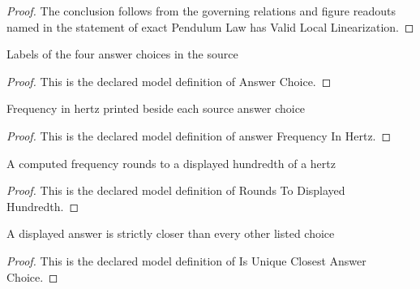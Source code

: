 \begin{proof}
  The conclusion follows from the governing relations and figure readouts named in the statement of exact Pendulum Law has Valid Local Linearization.
\end{proof}
\begin{definition}
  \label{def:physics:phyx-mini-0719:phyxminiproblems-problemphyxmini0719-answerchoice}
  Labels of the four answer choices in the source
\end{definition}
\begin{proof}
  This is the declared model definition of Answer Choice.
\end{proof}
\begin{definition}
  \label{def:physics:phyx-mini-0719:phyxminiproblems-problemphyxmini0719-answerfrequencyinhertz}
  Frequency in hertz printed beside each source answer choice
\end{definition}
\begin{proof}
  This is the declared model definition of answer Frequency In Hertz.
\end{proof}
\begin{definition}
  \label{def:physics:phyx-mini-0719:phyxminiproblems-problemphyxmini0719-roundstodisplayedhundredth}
  A computed frequency rounds to a displayed hundredth of a hertz
\end{definition}
\begin{proof}
  This is the declared model definition of Rounds To Displayed Hundredth.
\end{proof}
\begin{definition}
  \label{def:physics:phyx-mini-0719:phyxminiproblems-problemphyxmini0719-isuniqueclosestanswerchoice}
  A displayed answer is strictly closer than every other listed choice
\end{definition}
\begin{proof}
  This is the declared model definition of Is Unique Closest Answer Choice.
\end{proof}
